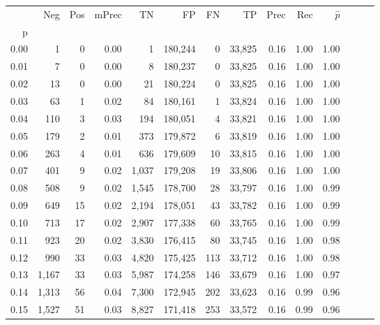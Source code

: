 \begin{tabular}{rrrrrrrrrrrrrr}
\toprule
{} &    Neg &  Pos & mPrec &       TN &       FP &      FN &      TP &  Prec &   Rec & $\hat{p}$ \\
p    &        &      &       &          &          &         &         &       &       &           \\
\midrule
0.00 &      1 &    0 &  0.00 &        1 &  180,244 &       0 &  33,825 &  0.16 &  1.00 &      1.00 \\
0.01 &      7 &    0 &  0.00 &        8 &  180,237 &       0 &  33,825 &  0.16 &  1.00 &      1.00 \\
0.02 &     13 &    0 &  0.00 &       21 &  180,224 &       0 &  33,825 &  0.16 &  1.00 &      1.00 \\
0.03 &     63 &    1 &  0.02 &       84 &  180,161 &       1 &  33,824 &  0.16 &  1.00 &      1.00 \\
0.04 &    110 &    3 &  0.03 &      194 &  180,051 &       4 &  33,821 &  0.16 &  1.00 &      1.00 \\
0.05 &    179 &    2 &  0.01 &      373 &  179,872 &       6 &  33,819 &  0.16 &  1.00 &      1.00 \\
0.06 &    263 &    4 &  0.01 &      636 &  179,609 &      10 &  33,815 &  0.16 &  1.00 &      1.00 \\
0.07 &    401 &    9 &  0.02 &    1,037 &  179,208 &      19 &  33,806 &  0.16 &  1.00 &      1.00 \\
0.08 &    508 &    9 &  0.02 &    1,545 &  178,700 &      28 &  33,797 &  0.16 &  1.00 &      0.99 \\
0.09 &    649 &   15 &  0.02 &    2,194 &  178,051 &      43 &  33,782 &  0.16 &  1.00 &      0.99 \\
0.10 &    713 &   17 &  0.02 &    2,907 &  177,338 &      60 &  33,765 &  0.16 &  1.00 &      0.99 \\
0.11 &    923 &   20 &  0.02 &    3,830 &  176,415 &      80 &  33,745 &  0.16 &  1.00 &      0.98 \\
0.12 &    990 &   33 &  0.03 &    4,820 &  175,425 &     113 &  33,712 &  0.16 &  1.00 &      0.98 \\
0.13 &  1,167 &   33 &  0.03 &    5,987 &  174,258 &     146 &  33,679 &  0.16 &  1.00 &      0.97 \\
0.14 &  1,313 &   56 &  0.04 &    7,300 &  172,945 &     202 &  33,623 &  0.16 &  0.99 &      0.96 \\
0.15 &  1,527 &   51 &  0.03 &    8,827 &  171,418 &     253 &  33,572 &  0.16 &  0.99 &      0.96 \\

\end{tabular}
